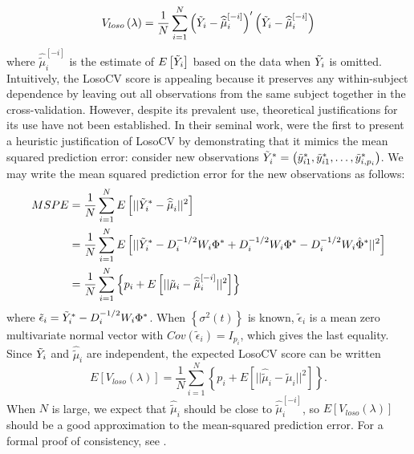 \begin{equation} \label{eq:LOSOCV}
V_{loso}\left(\lambda\right) = \frac{1}{N}\sum_{i=1}^N \left( \tilde{Y}_i - \widehat{\tilde{\mu}}^{\left[-i\right]}_{i}\right)'\left( \tilde{Y}_i -  \widehat{\tilde{\mu}}^{\left[-i\right]}_{i}\right)
\end{equation}
\noindent
where $\widehat{\tilde{\mu}}^{\left[-i\right]}_{i}$ is the estimate of $E\left[ \tilde{Y}_i \right]$ based on the data when $\tilde{Y}_i$ is omitted. Intuitively, the LosoCV score is appealing because it preserves any within-subject dependence by leaving out all observations from the same subject together in the cross-validation.  However, despite its prevalent use, theoretical justifications for its use have not been established. In their seminal work, \cite{rice1991estimating} were the first to present a heuristic justification of LosoCV by demonstrating that it mimics the mean squared prediction error: consider new observations $\tilde{Y}^*_i = \left(\tilde{y}_{i1}^*, \tilde{y}_{i1}^*, \dots, \tilde{y}_{i, p_i}^*\right)$. We may write the mean squared prediction error for the new observations as follows:  
\bigskip 
\begin{align}
\begin{split}\label{eq:MSPE}
MSPE &= \frac{1}{N}\sum_{i=1}^N E\left[ \vert \vert \tilde{Y}^*_i - \widehat{\tilde{\mu}}_{i} \vert \vert^2 \right]\\
&=  \frac{1}{N}\sum_{i=1}^N E\left[ \vert \vert \tilde{Y}^*_i - D_i^{-1/2}W_i \Phi^* + D_i^{-1/2}W_i \Phi^* - D_i^{-1/2}W_i \hat{\Phi}^*\vert \vert^2 \right]\\
&=  \frac{1}{N}\sum_{i=1}^N \left\{p_i + E\left[ \vert \vert \tilde{\mu}_{i} - \widehat{\tilde{\mu}}^{\left[ -i \right]}_{i} \vert \vert^2 \right] \right\}
\end{split}
\end{align}
\noindent
where $\tilde{\epsilon}_i = \tilde{Y}^*_i - D_i^{-1/2}W_i \Phi^*$. When $\left\{ \sigma^2\left(t\right)\right\}$ is known, $\tilde{\epsilon}_i$ is a mean zero multivariate normal vector with $Cov\left(\tilde{\epsilon}_i\right) = I_{p_i}$, which gives the last equality. Since $\tilde{Y}_i$ and $ \widehat{\tilde{\mu}}_{i} $ are independent, the expected LosoCV score can be written
\begin{equation} \label{eq:MSPE_LOSOCV}
E\left[V_{loso}\left(\lambda\right) \right] =  \frac{1}{N}\sum_{i=1}^N\left\{ p_i +  E\left[ \vert \vert \widehat{\tilde{\mu}}_{i} - \tilde{\mu}_{i} \vert \vert^2 \right] \right\}. 
\end{equation}
\noindent
When $N$ is large, we expect that $\widehat{\tilde{\mu}}_{i}$ should be close to $\widehat{\tilde{\mu}}^{\left[ -i \right]}_{i}$, so $E\left[V_{loso}\left(\lambda\right) \right]$ should be a good approximation to the mean-squared prediction error. For a formal proof of consistency, see \cite{xu2012asymptotic}.

